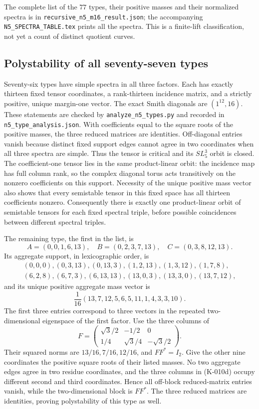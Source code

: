 The complete list of the $77$ types, their positive masses and their
normalized spectra is in
\texttt{recursive\_n5\_m16\_result.json}; the accompanying
\texttt{N5\_SPECTRA\_TABLE.tex} prints all the spectra.  This is a
finite-lift classification, not yet a count of distinct quotient curves.

\subsection*{Polystability of all seventy-seven types}
Seventy-six types have simple spectra in all three factors.  Each has
exactly thirteen fixed tensor coordinates, a rank-thirteen incidence
matrix, and a strictly positive, unique margin-one vector.  The exact
Smith diagonals are $(1^{12},16)$.  These statements are checked by
\texttt{analyze\_n5\_types.py} and recorded in
\texttt{n5\_type\_analysis.json}.  With coefficients equal to the square
roots of the positive masses, the three reduced matrices are identities.
Off-diagonal entries vanish because distinct fixed support edges cannot
agree in two coordinates when all three spectra are simple.  Thus the
tensor is critical and its $SL_5^3$ orbit is closed.  The coefficient-one
tensor lies in the same product-linear orbit: the incidence map has full
column rank, so the complex diagonal torus acts transitively on the
nonzero coefficients on this support.  Necessity of the unique positive
mass vector also shows that every semistable tensor in this fixed space
has all thirteen coefficients nonzero.  Consequently there is exactly
one product-linear orbit of semistable tensors for each fixed spectral
triple, before possible coincidences between different spectral triples.

The remaining type, the first in the list, is
\[
 A=(0,0,1,6,13),\quad B=(0,2,3,7,13),\quad C=(0,3,8,12,13).
                                                               \tag{K-010b}
\]
Its aggregate support, in lexicographic order, is
\[
\begin{gathered}
 (0,0,0),(0,3,13),(0,13,3),(1,2,13),(1,3,12),(1,7,8),\\
 (6,2,8),(6,7,3),(6,13,13),(13,0,3),(13,3,0),(13,7,12),
\end{gathered}
\]
and its unique positive aggregate mass vector is
\[
 \frac1{16}(13,7,12,5,6,5,11,1,4,3,3,10).                    \tag{K-010c}
\]
The first three entries correspond to three vectors in the repeated
two-dimensional eigenspace of the first factor.  Use the three columns
of
\[
 F=\begin{pmatrix}
 \sqrt3/2&-1/2&0\\[2pt]
 1/4&\sqrt3/4&-\sqrt3/2
 \end{pmatrix}.                                               \tag{K-010d}
\]
Their squared norms are $13/16,7/16,12/16$, and $FF^*=I_2$.
Give the other nine coordinates the positive square roots of their
listed masses.  No two aggregate edges agree in two residue coordinates,
and the three columns in (K-010d) occupy different second and third
coordinates.  Hence all off-block reduced-matrix entries vanish, while
the two-dimensional block is $FF^*$.  The three reduced matrices are
identities, proving polystability of this type as well.

